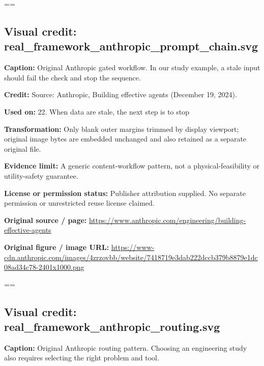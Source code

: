 \documentclass[10pt,letterpaper]{article}
\begin{document}
\egroup\par\noindent\box\readingEntry\par\medskip
\setbox\readingEntry=\vbox\bgroup\hsize=\linewidth\subsection*{Visual credit: real\_framework\_anthropic\_prompt\_chain.svg}
\textbf{Caption:} Original Anthropic gated workflow. In our study example, a stale input should fail the check and stop the sequence.\par
\textbf{Credit:} Source: Anthropic, Building effective agents (December 19, 2024).\par
\textbf{Used on:} 22. When data are stale, the next step is to stop\par
\textbf{Transformation:} Only blank outer margins trimmed by display viewport; original image bytes are embedded unchanged and also retained as a separate original file.\par
\textbf{Evidence limit:} A generic content-workflow pattern, not a physical-feasibility or utility-safety guarantee.\par
\textbf{License or permission status:} Publisher attribution supplied. No separate permission or unrestricted reuse license claimed.\par
\textbf{Original source / page:} \href{https://www.anthropic.com/engineering/building-effective-agents}{\small\ttfamily https:/\allowbreak{}/\allowbreak{}www.\allowbreak{}anthropic.\allowbreak{}com/\allowbreak{}engineering/\allowbreak{}building-\allowbreak{}effective-\allowbreak{}agents}\par
\textbf{Original figure / image URL:} \href{https://www-cdn.anthropic.com/images/4zrzovbb/website/7418719e3dab222dccb379b8879e1dc08ad34c78-2401x1000.png}{\small\ttfamily https:/\allowbreak{}/\allowbreak{}www-\allowbreak{}cdn.\allowbreak{}anthropic.\allowbreak{}com/\allowbreak{}images/\allowbreak{}4zrzovbb/\allowbreak{}website/\allowbreak{}7418719e3dab222dccb379b8879e1dc08ad34c78-\allowbreak{}2401x1000.\allowbreak{}png}\par
\egroup\par\noindent\box\readingEntry\par\medskip
\setbox\readingEntry=\vbox\bgroup\hsize=\linewidth\subsection*{Visual credit: real\_framework\_anthropic\_routing.svg}
\textbf{Caption:} Original Anthropic routing pattern. Choosing an engineering study also requires selecting the right problem and tool.\par
\end{document}
